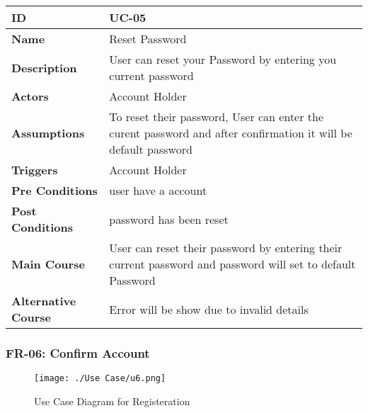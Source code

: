     \begin{center}
        \begin{tabularx}{\textwidth}{|l|X|}
            \hline
            \textbf{ID} & UC-05 \\
            \hline
            \textbf{Name} & Reset Password \\
            \hline
            \textbf{Description} & User can reset your Password by entering you current password \\
            \hline
            \textbf{Actors} & Account Holder \\
            \hline
            \textbf{Assumptions} & To reset their password, User can enter the curent password and after confirmation it will be default password  \\
            \hline
            \textbf{Triggers} & Account Holder \\
            \hline
            \textbf{Pre Conditions} & user have a account \\
            \hline
            \textbf{Post Conditions} & password has been reset \\
            \hline
            \textbf{Main Course} & User can reset their password by entering their current password and password will set to default Password \\
            \hline
            \textbf{Alternative Course} & Error will be show due to invalid details \\
            \hline
            
        \end{tabularx}
    \end{center}
    \newpage
    

    \subsubsection{FR-06: Confirm Account}
    \begin{figure}[H]
        \texttt{[image: ./Use Case/u6.png]}
        \centering 
        \caption{Use Case Diagram for Registeration}
        \label{fig:prototype1}
        \end{figure}
        
